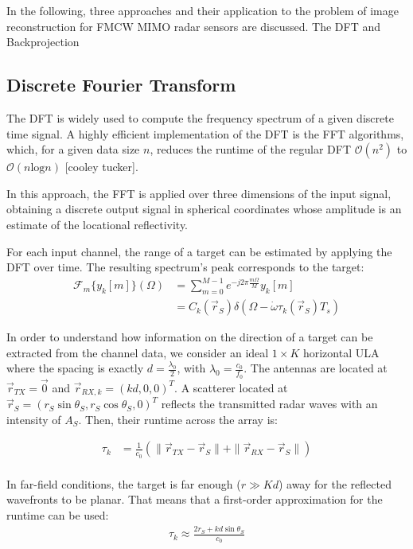 In the following, three approaches and their application to
the problem of image reconstruction for FMCW MIMO radar sensors are discussed.
The DFT and Backprojection 

\subsection{Discrete Fourier Transform}
\label{ssec:dft_imaging_theory}
The DFT is widely used to compute the frequency spectrum of a given discrete time signal.
A highly efficient implementation of the DFT is the FFT algorithms, which, 
for a given data size $n$, reduces the runtime of the regular DFT $\mathcal O(n^2)$ to $\mathcal O(n\text{log}n)$ [cooley tucker].

In this approach, the FFT is applied over three dimensions of the input signal,
obtaining a discrete output signal in spherical coordinates whose amplitude is an estimate of the locational reflectivity.

For each input channel, the range of a target can be estimated by applying the DFT over time.
The resulting spectrum's peak corresponds to the target:
\begin{align}
    \mathcal{F}_m\{y_k[m]\}(\Omega) & = \sum_{m=0}^{M-1} e^{-j2\pi\frac{m\Omega}{M}} y_k[m]                            \\
                                    & = C_k(\vec r_S) \delta(\Omega-\dot \omega \tau_k(\vec r_S)T_s) \label{eqn:y_fft}
\end{align}


In order to understand how information on the direction of a target can be extracted from the channel data,
we consider an ideal $1 \times K$ horizontal ULA
where the spacing is exactly $d=\frac{\lambda_0}{2}$, with $\lambda_0 = \frac{c_0}{f_0}$.
The antennas are located at $\vec r_{TX}= \vec 0$ and $\vec r_{RX,k}=(kd,0,0)^T$.
A scatterer located at  $\vec r_S = (r_S\sin\theta_S, r_{S}\cos\theta_S , 0)^T$
reflects the transmitted radar waves with an intensity of $A_S$.
Then, their runtime across the array is:

\begin{align}
    \tau_k & =\frac{1}{c_0} \left( \| \vec r_{TX} - \vec r_S \|+\| \vec r_{RX} - \vec r_S \| \right) \\
\end{align}

In far-field conditions, the target is far enough ($r \gg K d$) away for the reflected wavefronts to be planar.
That means that a first-order approximation for the runtime can be used:
\begin{align}
    \tau_k \approx \frac{2r_S + kd\sin\theta_S}{c_0}
\end{align}

